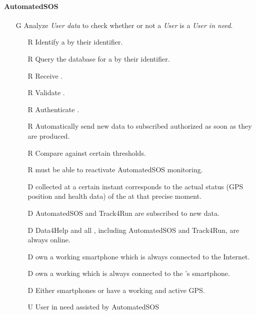 \documentclass[../../rasd.tex]{subfiles}
\begin{document}
        \paragraph{AutomatedSOS}
        \begin{itemize}
            \item[G\subs{6}]Analyze \textit{User data} to check whether or not a \textit{User} is a \textit{User in need}.
            \begin{itemize}
                \item[R\subs{6}]Identify a  by their identifier.
                \item[R\subs{7}]Query the database for a  by their identifier.
                \item[R\subs{8}]Receive .
                \item[R\subs{9}]Validate .
                \item[R\subs{10}]Authenticate .
                \item[R\subs{29}]Automatically send new data to subscribed authorized  as soon as they are produced.
                \item[R\subs{36}]Compare  against certain thresholds.
                \item[R\subs{38}] must be able to reactivate AutomatedSOS monitoring.
                \\
                \item[D\subs{2}] collected at a certain instant corresponds to the actual status (GPS position and health data) of the  at that precise moment.              
                \item[D\subs{6}]AutomatedSOS and Track4Run are subscribed to new data.
                \item[D\subs{9}]Data4Help and all , including AutomatedSOS and Track4Run, are always online.
                \item[D\subs{10}] own a working smartphone which is always connected to the Internet.
                \item[D\subs{11}] own a working  which is always connected to the 's smartphone.
                \item[D\subs{12}]Either smartphones or  have a working and active GPS.
                \\
                \item[U\subs{11}]User in need assisted by AutomatedSOS
            \end{itemize}


\end{itemize}
\end{document}
